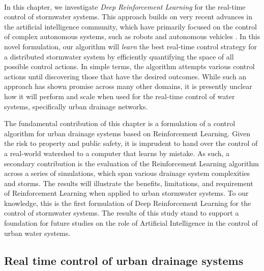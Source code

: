 \

In this chapter, we investigate \textit{Deep Reinforcement Learning} for the real-time control of stormwater systems.
This approach builds on very recent advances in the artificial intelligence community, which have primarily focused on the control of complex autonomous systems, such as robots and autonomous vehicles \cite{Mnih2015,Lillicrap2015ContinuousLearning}.
In this novel formulation, our algorithm will \textit{learn} the best real-time control strategy for a distributed stormwater system by efficiently quantifying the space of all possible control actions.
In simple terms, the algorithm attempts various control actions until discovering those that have the desired outcomes.
While such an approach has shown promise across many other domains, it is presently unclear how it will perform and scale when used for the real-time control of water systems, specifically urban drainage networks.

The fundamental contribution of this chapter is a formulation of a control algorithm for urban drainage systems based on Reinforcement Learning.
Given the risk to property and public safety, it is imprudent to hand over the control of a real-world watershed to a computer that learns by mistake.
As such, a secondary contribution is the evaluation of the Reinforcement Learning algorithm across a series of simulations, which span various drainage system complexities and storms.
The results will illustrate the benefits, limitations, and requirement of Reinforcement Learning when applied to urban stormwater systems.
To our knowledge, this is the first formulation of Deep Reinforcement Learning for the control of stormwater systems.
The results of this study stand to support a foundation for future studies on the role of Artificial Intelligence in the control of urban water systems.

\subsection{Real time control of urban drainage systems}



